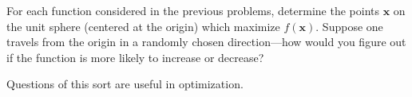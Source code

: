 \documentclass[10pt]{amsart}
\theoremstyle{mythm}
\theoremstyle{definition}
\theoremstyle{myrmk}
\begin{document}
	For each function considered in the previous problems, determine the points $\bm{x}$ on the unit sphere (centered at the origin) which maximize $f(\bm{x})$. Suppose one travels from the origin in a randomly chosen direction---how would you figure out if the function is more likely to increase or decrease? 
	
	Questions of this sort are useful in optimization. 
	
	
	
	
	
	
		
	
	
	
	
	
	
	
	
\end{document}
